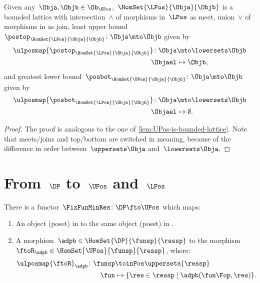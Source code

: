 \begin{lemma}
	\label{lem:LPos-is-bounded-lattice}
	Given any~$\Obja,\Objb\in \Ob_\UPos$,~$\HomSet{\LPos}{\Obja}{\Objb}$ is a bounded lattice with intersection~$\wedge$ of morphisms in~$\LPos$ as meet, union~$\vee$ of morphisms in \LPos as join, least upper bound~$\postop_{\HomSet{\LPos}{\Obja}{\Objb}}\colon \Obja \mto \Objb$ given by
	\begin{equation*}
		\begin{aligned}
			\ulposmap{\postop_{\HomSet{\LPos}{\Obja}{\Objb}}}\colon \Obja & \mto \lowersets \Objb \\
			\Objael                                                       & \mapsto \Objb,
		\end{aligned}
	\end{equation*}
	and greatest lower bound~$\posbot_{\HomSet{\UPos}{\Obja}{\Objb}}\colon \Obja \mto \Objb$ given by
	\begin{equation*}
		\begin{aligned}
			\ulposmap{\posbot_{\HomSet{\LPos}{\Obja}{\Objb}}}\colon \Obja & \mto \lowersets \Objb \\
			\Objael                                                       & \mapsto \emptyset.
		\end{aligned}
	\end{equation*}
\end{lemma}
\begin{proof}
	The proof is analogous to the one of \cref{lem:UPos-is-bounded-lattice}.
	Note that meets/joins and top/bottom are switched in meaning, because of the difference in order between~$\uppersets \Obja$ and~$\lowersets \Obja$.
\end{proof}

\section{From~$\DP$ to~$\UPos$ and~$\LPos$}

\begin{lemma}
	\label{lem:covfunctor}
	There is a functor~$\FixFunMinRes\colon \DP \fto \UPos$ which maps:
	\begin{enumerate}
		\item An object (poset) in \DP to the same object (poset) in \UPos.
		\item A morphism~$\adpb\in \HomSet{\DP}{\funsp}{\ressp}$ to the morphism~$\ftoR_{\adpb}\in \HomSet{\UPos}{\funsp}{\ressp}$, where:
		      \begin{equation}
			      \begin{aligned}
				      \ulposmap{\ftoR}_{\adpb}\colon \funsp & \toinPos \uppersets{\ressp}                           \\
				      \fun                                  & \mapsto \{\res \in \ressp\mid \adpb(\fun\Fop,\res)\}.
			      \end{aligned}
		      \end{equation}
	\end{enumerate}
\end{lemma}

